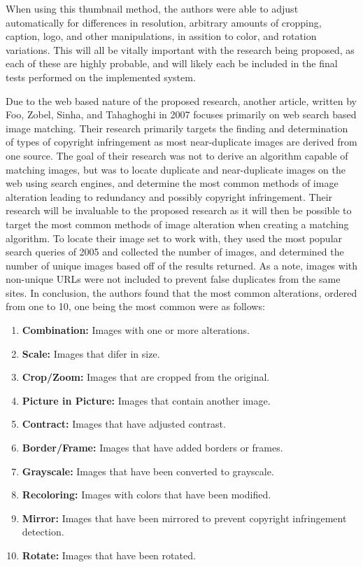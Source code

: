 \documentclass[11pt]{article}
\begin{document}
When using this thumbnail method, the authors were able to adjust automatically for differences in resolution, arbitrary amounts of cropping, caption, logo, and other manipulations, in assition to color, and rotation variations. This will all be vitally important with the research being proposed, as each of these are highly probable, and will likely each be included in the final tests performed on the implemented system.

Due to the web based nature of the proposed research, another article, written by Foo, Zobel, Sinha, and Tahaghoghi in 2007 focuses primarily on web search based image matching. Their research primarily targets the finding and determination of types of copyright infringement as most near-duplicate images are derived from one source. The goal of their research was not to derive an algorithm capable of matching images, but was to locate duplicate and near-duplicate images on the web using search engines, and determine the most common methods of image alteration leading to redundancy and possibly copyright infringement. Their research will be invaluable to the proposed research as it will then be possible to target the most common methods of image alteration when creating a matching algorithm. To locate their image set to work with, they used the most popular search queries of 2005 and collected the number of images, and determined the number of unique images based off of the results returned. As a note, images with non-unique URLs were not included to prevent false duplicates from the same sites. In conclusion, the authors found that the most common alterations, ordered from one to 10, one being the most common were as follows: \cite{Foo:2007}
\begin{enumerate}
\item
\textbf{Combination:} Images with one or more alterations.
\item
\textbf{Scale:} Images that difer in size.
\item
\textbf{Crop/Zoom:} Images that are cropped from the original.
\item
\textbf{Picture in Picture:} Images that contain another image.
\item
\textbf{Contract:} Images that have adjusted contrast.
\item
\textbf{Border/Frame:} Images that have added borders or frames.
\item
\textbf{Grayscale:} Images that have been converted to grayscale.
\item
\textbf{Recoloring:} Images with colors that have been modified.
\item
\textbf{Mirror:} Images that have been mirrored to prevent copyright infringement detection.
\item
\textbf{Rotate:} Images that have been rotated.
\end{enumerate}
\end{document}
